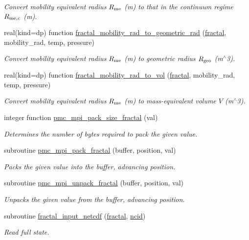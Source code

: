\begin{DoxyCompactItemize}
\begin{DoxyCompactList}\small\item\em Convert mobility equivalent radius $R_{\rm me}$ (m) to that in the continuum regime $R_{\rm me,c}$ (m). \end{DoxyCompactList}\item 
real(kind=dp) function \mbox{\hyperlink{namespacepmc__fractal_a5a96db0a65add8d9a10a5ecd23db411e}{fractal\+\_\+mobility\+\_\+rad\+\_\+to\+\_\+geometric\+\_\+rad}} (\mbox{\hyperlink{fractal_8_f90_a949ba7f6f3ce672ed686152acedb28bf}{fractal}}, mobility\+\_\+rad, temp, pressure)
\begin{DoxyCompactList}\small\item\em Convert mobility equivalent radius $R_{\rm me}$ (m) to geometric radius $R_{\rm geo}$ (m$^\wedge$3). \end{DoxyCompactList}\item 
real(kind=dp) function \mbox{\hyperlink{namespacepmc__fractal_a48f86afe7816da6444373e124096eb79}{fractal\+\_\+mobility\+\_\+rad\+\_\+to\+\_\+vol}} (\mbox{\hyperlink{fractal_8_f90_a949ba7f6f3ce672ed686152acedb28bf}{fractal}}, mobility\+\_\+rad, temp, pressure)
\begin{DoxyCompactList}\small\item\em Convert mobility equivalent radius $R_{\rm me}$ (m) to mass-\/equivalent volume $V$ (m$^\wedge$3). \end{DoxyCompactList}\item 
integer function \mbox{\hyperlink{namespacepmc__fractal_adecd2ec35451b0158ffef6654aa45720}{pmc\+\_\+mpi\+\_\+pack\+\_\+size\+\_\+fractal}} (val)
\begin{DoxyCompactList}\small\item\em Determines the number of bytes required to pack the given value. \end{DoxyCompactList}\item 
subroutine \mbox{\hyperlink{namespacepmc__fractal_a7967853f1099ae0d68022d0e37e6d7ca}{pmc\+\_\+mpi\+\_\+pack\+\_\+fractal}} (buffer, position, val)
\begin{DoxyCompactList}\small\item\em Packs the given value into the buffer, advancing position. \end{DoxyCompactList}\item 
subroutine \mbox{\hyperlink{namespacepmc__fractal_a51e9d76cccf2195ad7935a4ac5f18053}{pmc\+\_\+mpi\+\_\+unpack\+\_\+fractal}} (buffer, position, val)
\begin{DoxyCompactList}\small\item\em Unpacks the given value from the buffer, advancing position. \end{DoxyCompactList}\item 
subroutine \mbox{\hyperlink{namespacepmc__fractal_a877461eecd82d72d4084ef6ce9069bdd}{fractal\+\_\+input\+\_\+netcdf}} (\mbox{\hyperlink{fractal_8_f90_a949ba7f6f3ce672ed686152acedb28bf}{fractal}}, \mbox{\hyperlink{fractal_8_f90_a4e89f3f850921ff84a6dfce8b166ad50}{ncid}})
\begin{DoxyCompactList}\small\item\em Read full state. \end{DoxyCompactList}\end{DoxyCompactItemize}
